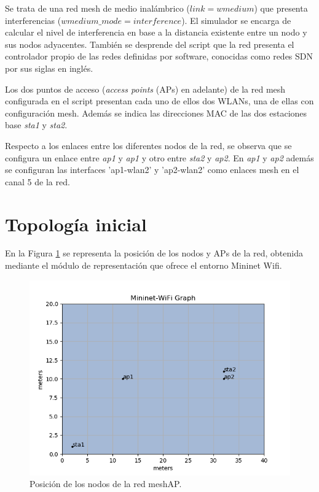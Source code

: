 \documentclass[a4paper,12pt,twoside,spanish]{book}
\begin{document}
Se trata de una red mesh de medio inalámbrico ($link=wmedium$) que presenta interferencias ($wmedium\_mode=interference$). El simulador se encarga de calcular el nivel de interferencia en base a la distancia existente entre un nodo y sus nodos adyacentes. También se desprende del script que la red presenta el controlador propio de las redes definidas por software, conocidas como redes SDN por sus siglas en inglés.\par

Los dos puntos de acceso (\textit{access points} (APs) en adelante) de la red mesh configurada en el script presentan cada uno de ellos dos WLANs, una de ellas con configuración mesh. Además se indica las direcciones MAC de las dos estaciones base \textit{sta1} y \textit{sta2}.\par

Respecto a los enlaces entre los diferentes nodos de la red, se observa que se configura un enlace entre \textit{ap1} y \textit{ap1} y otro entre \textit{sta2} y \textit{ap2}. En \textit{ap1} y \textit{ap2} además se configuran las interfaces 'ap1-wlan2' y 'ap2-wlan2' como enlaces mesh en el canal 5 de la red.\par








\section{Topología inicial}\label{sect:topo_inicial}

En la Figura \ref{fig:pos} se representa la posición de los nodos y APs de la red, obtenida mediante el módulo de representación que ofrece el entorno Mininet Wifi.

	\begin{figure}[!h]
		\centering
		\includegraphics[scale=0.7]{Figuras/posicion.png}
		\caption{Posición de los nodos de la red meshAP.}
		\label{fig:pos}
	\end{figure}
\end{document}
